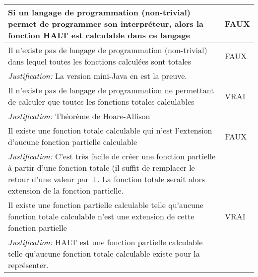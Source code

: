 \begin{tabular}{p{13cm}|l}
    \hline
    Si un langage de programmation (non-trivial) permet de programmer son interpréteur, alors la fonction HALT est calculable dans ce langage & FAUX \\
    \hline
    Il n'existe pas de langage de programmation (non-trivial) dans lequel toutes les fonctions calculées sont totales & FAUX  \\
    \textit{Justification:} La version mini-Java en est la preuve. & \\
    \hline
    Il n'existe pas de langage de programmation ne permettant de calculer que toutes les fonctions totales calculables & VRAI\\
    \textit{Justification:} Théorème de Hoare-Allison & \\
    \hline
    Il existe une fonction totale calculable qui n'est l'extension d'aucune fonction partielle calculable & FAUX \\
    \textit{Justification:} C'est très facile de créer une fonction partielle à partir d'une fonction totale (il suffit de remplacer le retour d'une valeur par $\bot$. La fonction totale serait alors extension de la fonction partielle. & \\
    \hline
    Il existe une fonction partielle calculable telle qu'aucune fonction totale calculable n'est une extension de cette fonction partielle & VRAI \\
    \textit{Justification:} HALT est une fonction partielle calculable telle qu'aucune fonction totale calculable existe pour la représenter. & \\

\end{tabular}
